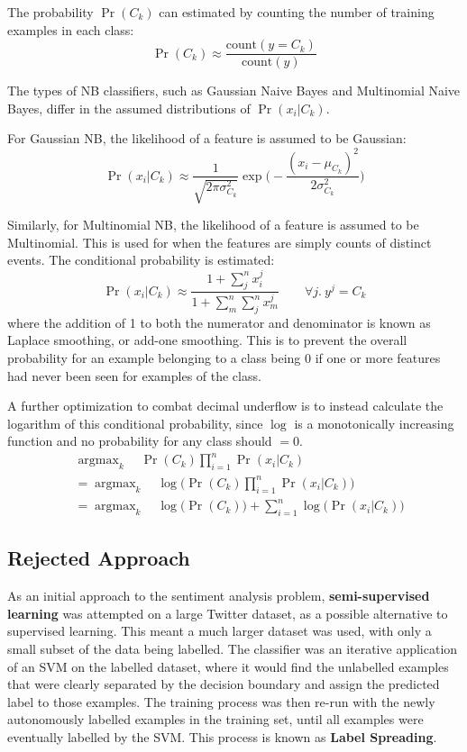 \documentclass[12pt,a4paper,twoside,openright]{report}
\DeclareMathOperator*{\argmax}{argmax}
\begin{document}
The probability $\Pr(C_k)$ can estimated by counting
the number of training examples in each class:
\begin{equation}
\Pr(C_k) \approx \frac{\text{count}(y = C_k)}{\text{count}(y)}
\end{equation}

The types of NB classifiers, such as Gaussian Naive Bayes and Multinomial Naive Bayes,
differ in the assumed distributions of $\Pr(x_i | C_k)$. 

For Gaussian NB, the likelihood of a feature is assumed to be Gaussian:
\begin{equation}
	\Pr(x_i | C_k) \approx \frac{1}{\sqrt{2\pi\sigma_{C_k}^2}} \exp\bigg(-\frac{(x_i - \mu_{C_k})^2}{2\sigma_{C_k}^2}\bigg)
\end{equation}

Similarly, for Multinomial NB, the likelihood of a feature is assumed to be Multinomial. This is used
for when the features are simply counts of distinct events. The 
conditional probability is estimated\cite{Manning08}:
\begin{equation}
	\Pr(x_i | C_k) \approx \frac{1 + \sum_j^n x_i^j}{1 + \sum_m^n \sum_j^n x_m^j} \qquad \forall j.\ y^j=C_k
\end{equation}
where the addition of 1 to both the numerator and denominator is known as Laplace smoothing, or add-one smoothing.
This is to prevent the overall probability for an example belonging to a class being 0 if one or more features had 
never been seen for examples of the class.

A further optimization to combat decimal underflow is to instead calculate the logarithm of this conditional probability,
since $\log$ is a monotonically increasing function and no probability for any class should $= 0$.
\begin{align}
&\argmax_k\quad \Pr(C_k)\prod_{i=1}^n \Pr(x_i | C_k)\\
&=\argmax_k\quad \log\Big(\Pr(C_k)\prod_{i=1}^n \Pr(x_i | C_k)\Big)\\
&= \argmax_k\quad \log\big(\Pr(C_k)\big) + \sum_{i=1}^n \log\big(\Pr(x_i | C_k)\big)
\end{align}

\subsection{Rejected Approach}
\label{sec:prepRej}

As an initial approach to the sentiment analysis problem, \textbf{semi-supervised learning} was attempted
on a large Twitter dataset, as a possible alternative to supervised learning. This meant a much larger dataset
was used, with only a small subset of the data being labelled. The classifier was an iterative application
of an SVM on the labelled dataset, where it would find the unlabelled examples that were clearly
separated by the decision boundary and assign the predicted label to those examples. The training process
was then re-run with the newly autonomously labelled examples in the training set, until all examples
were eventually labelled by the SVM. This process is known as \textbf{Label Spreading}.
\end{document}
